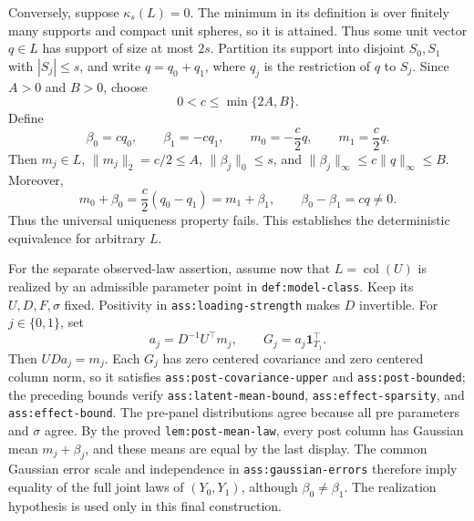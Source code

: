 Conversely, suppose \(\kappa_s(L)=0\).  The minimum in its definition is over finitely many supports and compact unit spheres, so it is attained.  Thus some unit vector \(q\in L\) has support of size at most \(2s\).  Partition its support into disjoint \(S_0,S_1\) with \(|S_j|\le s\), and write \(q=q_0+q_1\), where \(q_j\) is the restriction of \(q\) to \(S_j\).  Since \(A>0\) and \(B>0\), choose
\[
 0<c\le\min\{2A,B\}.
\]
Define
\[
 \beta_0=cq_0,
 \qquad \beta_1=-cq_1,
 \qquad m_0=-\frac c2q,
 \qquad m_1=\frac c2q.
\]
Then \(m_j\in L\), \(\lVert m_j\rVert_2=c/2\le A\), \(\lVert\beta_j\rVert_0\le s\), and \(\lVert\beta_j\rVert_\infty\le c\lVert q\rVert_\infty\le B\).  Moreover,
\[
 m_0+\beta_0
 =\frac c2(q_0-q_1)
 =m_1+\beta_1,
 \qquad
 \beta_0-\beta_1=cq\ne0.
\]
Thus the universal uniqueness property fails.  This establishes the deterministic equivalence for arbitrary \(L\).

For the separate observed-law assertion, assume now that \(L=\operatorname{col}(U)\) is realized by an admissible parameter point in \texttt{def:model-class}.  Keep its \(U,D,F,\sigma\) fixed.  Positivity in \texttt{ass:loading-strength} makes \(D\) invertible.  For \(j\in\{0,1\}\), set
\[
 a_j=D^{-1}U^{\top}m_j,
 \qquad G_j=a_j\mathbf 1_{T_1}^{\top}.
\]
Then \(UDa_j=m_j\).  Each \(G_j\) has zero centered covariance and zero centered column norm, so it satisfies \texttt{ass:post-covariance-upper} and \texttt{ass:post-bounded}; the preceding bounds verify \texttt{ass:latent-mean-bound}, \texttt{ass:effect-sparsity}, and \texttt{ass:effect-bound}.  The pre-panel distributions agree because all pre parameters and \(\sigma\) agree.  By the proved \texttt{lem:post-mean-law}, every post column has Gaussian mean \(m_j+\beta_j\), and these means are equal by the last display.  The common Gaussian error scale and independence in \texttt{ass:gaussian-errors} therefore imply equality of the full joint laws of \((Y_0,Y_1)\), although \(\beta_0\ne\beta_1\).  The realization hypothesis is used only in this final construction.


